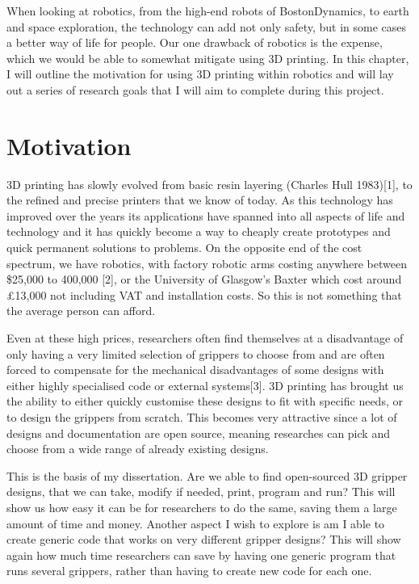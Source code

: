 \documentclass{l4proj}
\begin{document}
When looking at robotics, from the high-end robots of BostonDynamics, to earth and space exploration, the technology can add not only safety, but in some cases a better way of life for people. Our one drawback of robotics is the expense, which we would be able to somewhat mitigate using 3D printing. In this chapter, I will outline the motivation for using 3D printing within robotics and will lay out a series of research goals that I will aim to complete during this project. 


\section{Motivation}
3D printing has slowly evolved from basic resin layering (Charles Hull 1983)[1], to the refined and precise printers that we know of today. As this technology has improved over the years its applications have spanned into all aspects of life and technology and it has quickly become a way to cheaply create prototypes and quick permanent solutions to problems. On the opposite end of the cost spectrum, we have robotics, with factory robotic arms costing anywhere between \$25,000 to 400,000 [2], or the University of Glasgow's Baxter which cost around £13,000 not including VAT and installation costs. So this is not something that the average person can afford.

Even at these high prices, researchers often find themselves at a disadvantage of only having a very limited selection of grippers to choose from and are often forced to compensate for the mechanical disadvantages of some designs with either highly specialised code or external systems[3]. 3D printing has brought us the ability to either quickly customise these designs to fit with specific needs, or to design the grippers from scratch. This becomes very attractive since a lot of designs and documentation are open source, meaning researches can pick and choose from a wide range of already existing designs.  

This is the basis of my dissertation. Are we able to find open-sourced 3D gripper designs, that we can take, modify if needed, print, program and run? This will show us how easy it can be for researchers to do the same, saving them a large amount of time and money. Another aspect I wish to explore is am I able to create generic code that works on very different gripper designs? This will show again how much time researchers can save by having one generic program that runs several grippers, rather than having to create new code for each one. 
\end{document}
